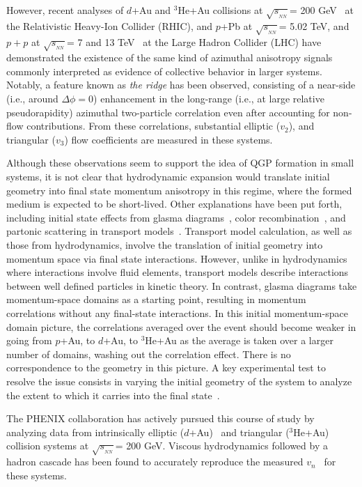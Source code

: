 \documentclass[%
reprint,
showpacs,preprintnumbers,
 amsmath,amssymb,
 aps,
]{revtex4-1}
\newcommand{\sqsn}{\mbox{$\sqrt{s_{_{NN}}}$}\xspace}
\newcommand{\dau}{\mbox{$d$+Au}\xspace}
\newcommand{\pau}{\mbox{$p$+Au}\xspace}
\newcommand{\hau}{\mbox{$^3\text{He}$+Au}\xspace}
\newcommand{\ppb}{\mbox{$p$+Pb}\xspace}
\begin{document}
However, recent analyses of \dau and \hau collisions at \sqsn = 200 GeV~\cite{Adare:2015ctn,PhysRevLett.111.212301,Adamczyk:2014fcx,PhysRevLett.115.142301} at the Relativistic Heavy-Ion Collider (RHIC), and \ppb at \sqsn = 5.02 TeV, and $p+p$ at \sqsn = 7 and 13 TeV~\cite{alice_long_2013,atlas_observation_2012,cms_observation_2012,Khachatryan:2015lva,Aad:2015gqa,Khachatryan:2010gv,Khachatryan:2016txc} at the Large Hadron Collider (LHC) have demonstrated the existence of the same kind of azimuthal anisotropy signals commonly interpreted as evidence of collective behavior in larger systems. Notably, a feature known as \textit{the ridge} has been observed, consisting of a near-side (i.e., around $\Delta \phi = 0$) enhancement in the long-range (i.e., at large relative pseudorapidity) azimuthal two-particle correlation even after accounting for non-flow contributions. From these correlations, substantial elliptic ($v_2$), and triangular ($v_3$) flow coefficients are measured in these systems.

Although these observations seem to support the idea of QGP formation in small systems, it is not clear that hydrodynamic expansion would translate initial geometry into final state momentum anisotropy in this regime, where the formed medium is expected to be short-lived. Other explanations have been put forth, including initial state effects from glasma diagrams~\cite{dusling_azimuthal_2012}, color recombination~\cite{Ortiz:2013yxa}, and partonic scattering in transport models~\cite{bzdak_elliptic_2014,ma_long-range_2014,Koop:2015wea}. Transport model calculation, as well as those from hydrodynamics, involve the translation of initial geometry into momentum space via final state interactions. However, unlike in hydrodynamics where interactions involve fluid elements, transport models describe interactions between well defined particles in kinetic theory. In contrast, glasma diagrams take momentum-space domains as a starting point, resulting in momentum correlations without any final-state interactions. In this initial momentum-space domain picture, the correlations averaged over the event should become weaker in going from \pau, to \dau, to \hau as the average is taken over a larger number of domains, washing out the correlation effect. There is no correspondence to the geometry in this picture. A key experimental test to resolve the issue consists in varying the initial geometry of the system to analyze the extent to which it carries into the final state~\cite{nagle_exploiting_2013}.

The PHENIX collaboration has actively pursued this course of study by analyzing data from intrinsically elliptic (\dau)~\cite{Adare:2015ctn,PhysRevLett.111.212301} and triangular (\hau)~\cite{Adare:2015ctn} collision systems at \sqsn = 200 GeV. Viscous hydrodynamics followed by a hadron cascade has been found to accurately reproduce the measured $v_n$~\cite{Romatschke:2015gxa,adare_measurement_2014,PhysRevLett.111.212301,Adare:2015ctn,Bozek:2015qpa} for these systems.
\end{document}
